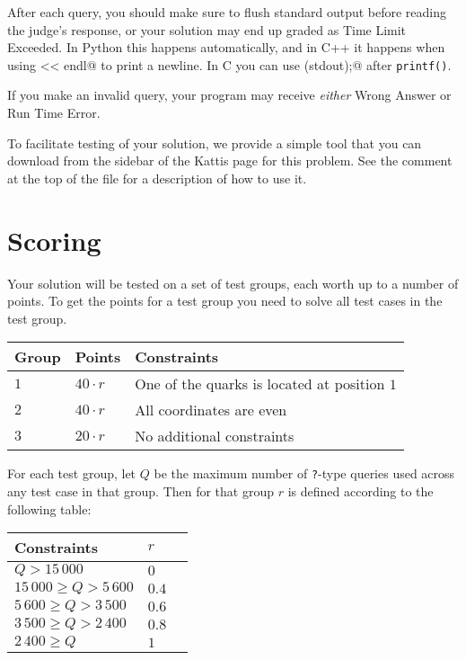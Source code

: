 After each query, you should make sure to flush standard output before reading the judge's response, or your solution may end up graded as Time Limit Exceeded.
In Python this happens automatically, and in C++ it happens when using \verb@cout << endl@ to print a newline.
In C you can use \verb@fflush(stdout);@ after \texttt{printf()}.

If you make an invalid query, your program may receive \emph{either} Wrong Answer or Run Time Error.

To facilitate testing of your solution, we provide a simple tool that you can download from the sidebar of the Kattis page for this problem.
See the comment at the top of the file for a description of how to use it.

\section*{Scoring}
Your solution will be tested on a set of test groups, each worth up to a number of points.
To get the points for a test group you need to solve all test cases in the test group.

\noindent
\begin{tabular}{| l | l | l |}
  \hline
  Group & Points       & Constraints \\ \hline
  $1$   & $40 \cdot r$ & One of the quarks is located at position $1$ \\ \hline
  $2$   & $40 \cdot r$ & All coordinates are even \\ \hline
  $3$   & $20 \cdot r$ & No additional constraints \\ \hline
\end{tabular}

For each test group, let $Q$ be the maximum number of \texttt{?}-type queries used across any test case in that group.
Then for that group $r$ is defined according to the following table:

\noindent
\begin{tabular}{| l | l | l |}
  \hline
  Constraints                & $r$ \\ \hline
  $             Q > 15\,000$ & $0$ \\ \hline
  $ 15\,000 \ge Q > 5\,600$  & $0.4$  \\ \hline
  $  5\,600 \ge Q > 3\,500$  & $0.6$  \\ \hline
  $  3\,500 \ge Q > 2\,400$  & $0.8$  \\ \hline
  $  2\,400 \ge Q$           & $1$  \\ \hline
\end{tabular}
